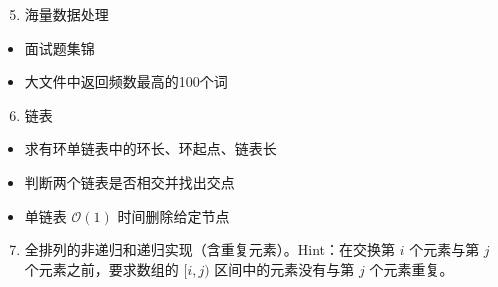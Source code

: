 \documentclass[letterpaper,10pt,english]{sphinxmanual}
\begin{document}
\begin{quote}

\end{quote}
\begin{enumerate}
\setcounter{enumi}{4}
\item {} 
海量数据处理

\end{enumerate}
\begin{itemize}
\item {} 
面试题集锦
\begin{quote}

\end{quote}

\item {} 
大文件中返回频数最高的100个词
\begin{quote}

\end{quote}

\end{itemize}
\begin{enumerate}
\setcounter{enumi}{5}
\item {} 
链表

\end{enumerate}
\begin{itemize}
\item {} 
求有环单链表中的环长、环起点、链表长
\begin{quote}

\end{quote}

\item {} 
判断两个链表是否相交并找出交点
\begin{quote}

\end{quote}

\item {} 
单链表 \(\mathcal{O}(1)\) 时间删除给定节点
\begin{quote}

\end{quote}

\end{itemize}
\begin{enumerate}
\setcounter{enumi}{6}
\item {} 
全排列的非递归和递归实现（含重复元素）。Hint：在交换第 \(i\) 个元素与第 \(j\) 个元素之前，要求数组的 \([i, j)\) 区间中的元素没有与第 \(j\) 个元素重复。

\end{enumerate}
\end{document}

